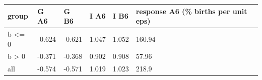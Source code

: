\begingroup\small
\setlength{\tabcolsep}{3pt}
\renewcommand{\arraystretch}{1.04}
\begin{tabularx}{\linewidth}{XXXXXX}
\toprule
group & G A6 & G B6 & I A6 & I B6 & response A6 (\% births per unit eps) \\
\midrule
b \textless{}= 0 & -0.624 & -0.621 & 1.047 & 1.052 & 160.94 \\
b \textgreater{} 0 & -0.371 & -0.368 & 0.902 & 0.908 & 57.96 \\
all & -0.574 & -0.571 & 1.019 & 1.023 & 218.9 \\
\bottomrule
\end{tabularx}
\endgroup
